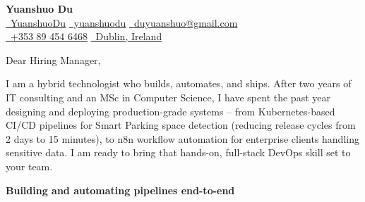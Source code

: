 \documentclass{coverletter}
\begin{document}
\begin{center}
  {\Large\sffamily\bfseries\color{namecolor} Yuanshuo Du}\\[0.12cm]
  {\sffamily\small
    \href{https://github.com/YuanshuoDu}{\color{accent}\faGithub\color{muted}\ YuanshuoDu}
    \quad\textbullet\quad
    \href{https://linkedin.com/in/yuanshuodu}{\color{accent}\faLinkedin\color{muted}\ yuanshuodu}
    \quad\textbullet\quad
    \href{https://mail.google.com/mail/?view=cm&to=duyuanshuo@gmail.com}{\color{accent}\faEnvelope\color{muted}\ duyuanshuo@gmail.com}
  }\\[0.06cm]
  {\sffamily\small\color{muted}
    \href{tel:+353894546468}{\color{accent}\faPhone\color{muted}\ +353 89 454 6468}
    \quad\textbullet\quad
    \href{https://www.google.com/maps/place/Dublin,+Ireland}{\color{accent}\faMapMarker\color{muted}\ Dublin, Ireland}
  }
\end{center}

\clrule

\noindent%
{\color{secondary}\sffamily\small
  Dear Hiring Manager,
}

\vspace{0.22cm}

\noindent%
{\color{secondary}\sffamily\small
  I am a hybrid technologist who builds, automates, and ships. After two years of IT consulting and an MSc in Computer Science, I have spent the past year designing and deploying production-grade systems -- from Kubernetes-based CI/CD pipelines for Smart Parking space detection (reducing release cycles from 2 days to 15 minutes), to n8n workflow automation for enterprise clients handling sensitive data. I am ready to bring that hands-on, full-stack DevOps skill set to your team.
}

\vspace{0.35cm}

\noindent%
{\color{secondary}\sffamily\small\bfseries
  Building and automating pipelines end-to-end
}
\end{document}
